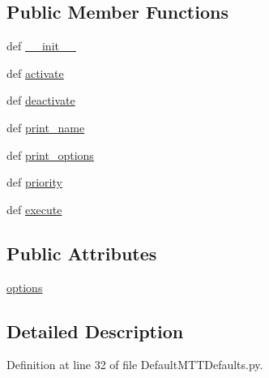 \subsection*{Public Member Functions}
\begin{DoxyCompactItemize}
\item 
def \hyperlink{classDefaultMTTDefaults_1_1DefaultMTTDefaults_af45ae89ffdda25b5db56cc32d6f38617}{\-\_\-\-\_\-init\-\_\-\-\_\-}
\item 
def \hyperlink{classDefaultMTTDefaults_1_1DefaultMTTDefaults_ab168e4b76bd07ff868f6d8c8dcfbabcd}{activate}
\item 
def \hyperlink{classDefaultMTTDefaults_1_1DefaultMTTDefaults_abbdeb62905e733e0145243e238991e1b}{deactivate}
\item 
def \hyperlink{classDefaultMTTDefaults_1_1DefaultMTTDefaults_a39fc17ab14b57f8aeaa7df1a6b32f059}{print\-\_\-name}
\item 
def \hyperlink{classDefaultMTTDefaults_1_1DefaultMTTDefaults_aedf1031336bf735bb00dcc8d80a0bd4a}{print\-\_\-options}
\item 
def \hyperlink{classDefaultMTTDefaults_1_1DefaultMTTDefaults_a22c85638c99e8a0dcb01d31c326bfc55}{priority}
\item 
def \hyperlink{classDefaultMTTDefaults_1_1DefaultMTTDefaults_a2ccbda4994ea610724763268ab05181e}{execute}
\end{DoxyCompactItemize}
\subsection*{Public Attributes}
\begin{DoxyCompactItemize}
\item 
\hyperlink{classDefaultMTTDefaults_1_1DefaultMTTDefaults_a733e1af4da36392ce6126d79c61aba0b}{options}
\end{DoxyCompactItemize}


\subsection{Detailed Description}


Definition at line 32 of file Default\-M\-T\-T\-Defaults.\-py.



